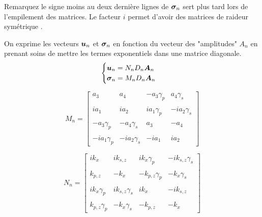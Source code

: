 Remarquez le signe moins au deux dernière lignes de $\bm{\sigma}_n$ sert plus tard lors de l'empilement des matrices. Le facteur $i$ permet d'avoir des matrices de raideur symétrique \cite{Kausel1981}.

On exprime les vecteurs $\bm{u}_n$ et $\bm{\sigma}_n$ en fonction du vecteur des "amplitudes" $A_n$ en prenant soins de mettre les termes exponentiels dans une matrice diagonale.  
\begin{equation}
    \begin{cases}
         \bm{u}_n      = N_n D_n \bm{A}_n \\
         \bm{\sigma}_n  = M_n D_n \bm{A}_n \\
    \end{cases}
\end{equation}

\begin{equation}
    M_n = \begin{bmatrix}
         a_3           & a_4           & -a_3\gamma_p & a_4\gamma_s \\ \\ 
         ia_1          & ia_2          & ia_1\gamma_p & -ia_2 \gamma_s \\  \\ 
         -a_3\gamma_p  & -a_4\gamma_s  & a_3          & -a_4 \\ \\ 
         -ia_1\gamma_p & -ia_2\gamma_s & -ia_1        & ia_2  
    \end{bmatrix} 
\end{equation}

\begin{equation}
        N_n = \begin{bmatrix}
         ik_x             & ik_{s,z}          & ik_x \gamma_p      & -ik_{s,z}\gamma_s \\ \\ 
         k_{p,z}          & -k_x              & -k_{p,z}\gamma_p  & -k_x    \gamma_s  \\ \\ 
         ik_x   \gamma_p  & ik_{s,z} \gamma_s & ik_x               & -ik_{s,z} \\ \\
         k_{p,z} \gamma_p & -k_x  \gamma_s    & -k_{p,z}           & -k_x     
    \end{bmatrix}
\end{equation}



